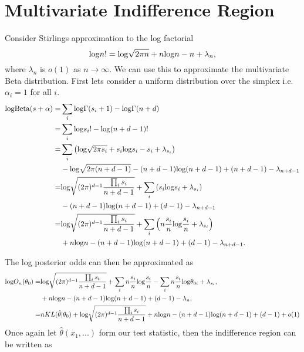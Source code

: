 \documentclass[11pt]{article}
\def\log{{\rm log}}
\begin{document}
\section{Multivariate Indifference Region}
Consider Stirlings approximation to the log factorial
\begin{equation}
  \label{eq:stirling_log_factorial}
  \log n! = \log\sqrt{2\pi n} + n \log n - n + \lambda_n,
\end{equation}
where $\lambda_n$ is $o(1)$ as $n\rightarrow \infty$. We can use this to approximate the multivariate Beta distribution. First lets consider a uniform distribution over the simplex i.e. $\alpha_i = 1$ for all $i$.
\begin{align*}
  \log \text{Beta}(s+\alpha) =& \sum_i \log \Gamma(s_i + 1) - \log \Gamma(n+d)\\
  =& \sum_i \log s_i! - \log (n+d-1)!\\
  =& \sum_i \left(\log\sqrt{2\pi s_i} + s_i \log s_i - s_i + \lambda_{s_i}\right)  \\
  &- \log\sqrt{2\pi (n+d-1)} - (n+d-1) \log (n+d-1) + (n+d-1) - \lambda_{n+d-1}\\
  =& \log\sqrt{(2\pi)^{d-1}\frac{ \prod_i s_i}{n+d-1}} +  \sum_i\left( s_i \log s_i + \lambda_{s_i}\right)  \\
       &- (n+d-1) \log (n+d-1) + (d-1) - \lambda_{n+d-1}\\
    =& \log\sqrt{(2\pi)^{d-1}\frac{ \prod_i s_i}{n+d-1}} +  \sum_i \left(n\frac{s_i}{n} \log \frac{s_i}n + \lambda_{s_i}\right)\\
       & + n\log n - (n+d-1) \log (n+d-1) + (d-1) - \lambda_{n+d-1}.
\end{align*}

The log posterior odds can then be approximated as
\begin{align*}
  \log O_n(\theta_0) =& \log\sqrt{(2\pi)^{d-1}\frac{ \prod_i s_i}{n+d-1}} +  \sum_i n\frac{s_i}{n} \log \frac{s_i}n -  \sum_i n\frac{s_i}{n} \log \theta_{0i} + \lambda_{s_i},  \\
                      & + n\log n - (n+d-1) \log (n+d-1) + (d-1) - \lambda_n,\\
   =& nKL(\hat{\theta}|\theta_0)+ \log\sqrt{(2\pi)^{d-1}\frac{ \prod_i s_i}{n+d-1}}  + n\log n - (n+d-1) \log (n+d-1) + (d-1)+o(1)\\
\end{align*}
Once again let $\hat{\theta}(x_1,...)$ form our test statistic, then the indifference region can be written as
\end{document}
